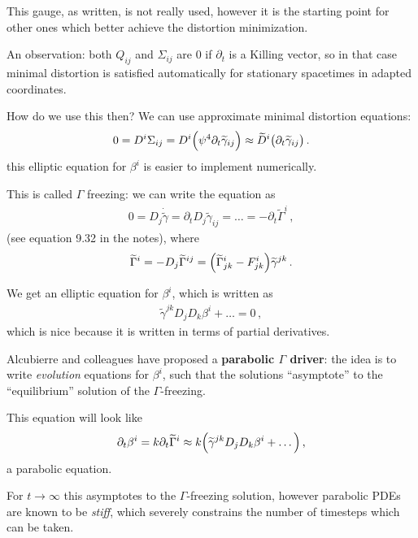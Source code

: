 \documentclass[main.tex]{subfiles}
\begin{document}
This gauge, as written, is not really used, however it is the starting point for other ones which better achieve the distortion minimization. 

An observation: both \(Q_{ij} \) and \(\Sigma_{ij}\) are 0 if \(\partial_{t}\) is a Killing vector, so in that case minimal distortion is satisfied automatically for stationary spacetimes in adapted coordinates.

How do we use this then? 
We can use approximate minimal distortion equations: 
%
\begin{align}
0 = D^{i} \Sigma_{ij} = D^{i} \qty(\psi^{4} \partial_{t} \widetilde{\gamma}_{ij}) \approx \widetilde{D}^{i} \qty(\partial_{t} \widetilde{\gamma}_{ij})
\,.
\end{align}
%
this elliptic equation for \(\beta^{i}\) is easier to implement numerically. 

This is called \(\Gamma \) freezing: we can write the equation as 
%
\begin{align}
0 = D_j \dot{\widetilde{\gamma}} = \partial_{t} D_j  \widetilde{\gamma}_{ij} = \dots = - \partial_{t} \widetilde{\Gamma}^{i}
\,,
\end{align}
%
(see equation 9.32 in the notes), where 
%
\begin{align}
\widetilde{\Gamma}^{i} = - D_j \widetilde{\Gamma}^{ij} = \qty(\widetilde{\Gamma}^{i}_{jk} - F^{i}_{jk}) \widetilde{\gamma}^{jk}
\,.
\end{align}

We get an elliptic equation for \(\beta^{i}\), which is written as 
%
\begin{align}
\widetilde{\gamma}^{jk} D_j D_k \beta^{i} + \dots = 0
\,,
\end{align}
%
which is nice because it is written in terms of partial derivatives.

Alcubierre and colleagues have proposed a \textbf{parabolic \(\Gamma \) driver}: the idea is to write \emph{evolution} equations for \(\beta^{i}\), such that the solutions ``asymptote'' to the ``equilibrium'' solution of the \(\Gamma \)-freezing.

This equation will look like  
%
\begin{align}
\partial_{t} \beta^{i} = k \partial_{t} \widetilde{\Gamma}^{i} \approx k \qty( \widetilde{\gamma}^{jk} D_j D_k \beta^{i} + \dots)
\,,
\end{align}
%
a parabolic equation. 

For \(t \to \infty \) this asymptotes to the \(\Gamma \)-freezing solution, however parabolic PDEs are known to be \emph{stiff}, which severely constrains the number of timesteps which can be taken. 
\end{document}
